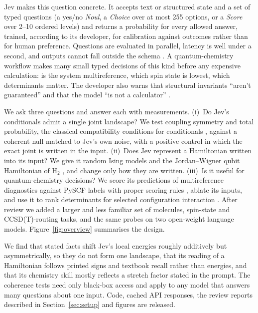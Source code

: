 \documentclass[11pt]{article}
\newcommand{\jev}{Jev}
\begin{document}
\jev{} \citep{typesafe2026introducing,typesafe2026api} makes this question concrete.
It accepts text or structured state and a set of typed questions (a yes/no \emph{Noul}, a \emph{Choice} over at most 255 options, or a \emph{Score} over 2--10 ordered levels) and returns a probability for every allowed answer, trained, according to its developer, for calibration against outcomes rather than for human preference.
Questions are evaluated in parallel, latency is well under a second, and outputs cannot fall outside the schema \citep{willison2026jev}.
A quantum-chemistry workflow makes many small typed decisions of this kind before any expensive calculation: is the system multireference, which spin state is lowest, which determinants matter.
The developer also warns that structural invariants ``aren't guaranteed'' and that the model ``is not a calculator'' \citep{typesafe2026jaggedness}.

We ask three questions and answer each with measurements.
(i)~Do \jev{}'s conditionals admit a single joint landscape?
We test coupling symmetry and total probability, the classical compatibility conditions for conditionals \citep{besag1974spatial,arnold1989compatible}, against a coherent null matched to \jev{}'s own noise, with a positive control in which the exact joint is written in the input.
(ii)~Does \jev{} represent a Hamiltonian written into its input?
We give it random Ising models and the Jordan--Wigner qubit Hamiltonian of H$_2$ \citep{jordan1928pauli,omalley2016scalable}, and change only how they are written.
(iii)~Is it useful for quantum-chemistry decisions?
We score its predictions of multireference diagnostics against PySCF labels with proper scoring rules \citep{gneiting2007strictly}, ablate its inputs, and use it to rank determinants for selected configuration interaction \citep{huron1973iterative,holmes2016heat}.
After review we added a larger and less familiar set of molecules, spin-state and CCSD(T)-routing tasks, and the same probes on two open-weight language models.
Figure~\ref{fig:overview} summarises the design.

We find that stated facts shift \jev{}'s local energies roughly additively but asymmetrically, so they do not form one landscape, that its reading of a Hamiltonian follows printed signs and textbook recall rather than energies, and that its chemistry skill mostly reflects a stretch factor stated in the prompt.
The coherence tests need only black-box access and apply to any model that answers many questions about one input.
Code, cached API responses, the review reports described in Section~\ref{sec:setup} and figures are released.
\end{document}
